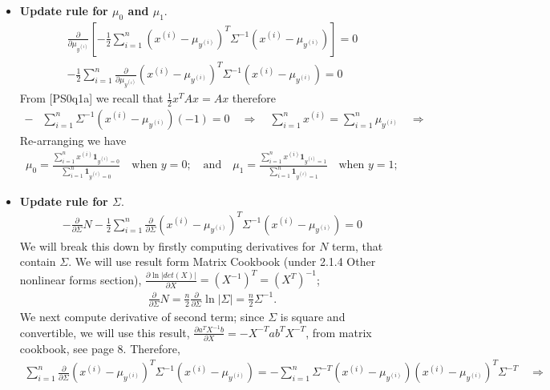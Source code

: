 \documentclass{article}
\begin{document}
\begin{enumerate}[label=\alph*)]
\begin{itemize}
\item \textbf{Update rule for $\mu_0$ and $\mu_1$}.
\begin{align*}
\frac{\partial}{\partial \mu_{y^{(i)}}}\left[-\frac{1}{2}\sum\limits_{i=1}^{n}(x^{(i)}-\mu_{y^{(i)}})^T\Sigma^{-1}(x^{(i)}-\mu_{y^{(i)}})\right] = 0\\
-\frac{1}{2}\sum_{i=1}^{n} \frac{\partial}{\partial \mu_{y^{(i)}}}(x^{(i)}-\mu_{y^{(i)}})^T\Sigma^{-1}(x^{(i)}-\mu_{y^{(i)}}) = 0
\end{align*}
From [PS0q1a] we recall that $\frac{1}{2}x^TAx = Ax$ therefore
\begin{align*}
-&\sum_{i=1}^{n}\Sigma^{-1}(x^{(i)}-\mu_{y^{(i)}})(-1) = 0 \quad \Rightarrow \quad
\sum_{i=1}^{n}x^{(i)}= \sum_{i=1}^{n}\mu_{y^{(i)}}\quad \Rightarrow
\end{align*}
Re-arranging we have
\begin{align*}
  \boxed{ \mu_0 = \frac{\sum\limits_{i=1}^{n}x^{(i)}\mathbf{1}_{{y^{(i)} = 0}}}{\sum\limits_{i=1}^{n}\mathbf{1}_{{y^{(i)} = 0}}} \quad \mbox{when $y=0$};}\quad\mbox{and}\quad\boxed{\mu_1 = \frac{\sum\limits_{i=1}^{n}x^{(i)}\mathbf{1}_{{y^{(i)} = 1}}}{\sum\limits_{i=1}^{n}\mathbf{1}_{{y^{(i)} = 1}}} \quad \mbox{when $y=1$};}
\end{align*}
  \item \textbf{Update rule for $\Sigma$}.
 \begin{align*} 
-\frac{\partial}{\partial \Sigma}N-\frac{1}{2}\sum_{i=1}^{n} \frac{\partial}{\partial \Sigma}(x^{(i)}-\mu_{y^{(i)}})^T\Sigma^{-1}(x^{(i)}-\mu_{y^{(i)}}) = 0
\end{align*}
We will break this down by  firstly computing derivatives for $N$ term, that contain $\Sigma$. We will use result form Matrix Cookbook (under 2.1.4 Other nonlinear forms section), $\frac{\partial\ln|det(X)|}{\partial X} = (X^{-1})^{T}=(X^T)^{-1}$; 
\begin{align*}
  \frac{\partial}{\partial \Sigma}N =  \frac{n}{2} \frac{\partial}{\partial \Sigma}\ln|\Sigma| = \frac{n}{2}\Sigma^{-1}.
\end{align*}
We next compute derivative of second term; since $\Sigma$ is square and convertible, we will use this result, $\frac{\partial a^TX^{-1}b}{\partial X} = -X^{-T}ab^TX^{-T}$, from matrix cookbook, see page 8. Therefore,
\begin{align*}
\sum_{i=1}^{n} \frac{\partial}{\partial \Sigma}(x^{(i)}-\mu_{y^{(i)}})^T\Sigma^{-1}(x^{(i)}-\mu_{y^{(i)}}) =
-\sum\limits_{i=1}^{n}\Sigma^{-T}(x^{(i)}-\mu_{y^{(i)}})(x^{(i)}-\mu_{y^{(i)}})^T\Sigma^{-T} \quad\Rightarrow 

\end{align*}
\end{itemize}
\end{enumerate}
\end{document}
